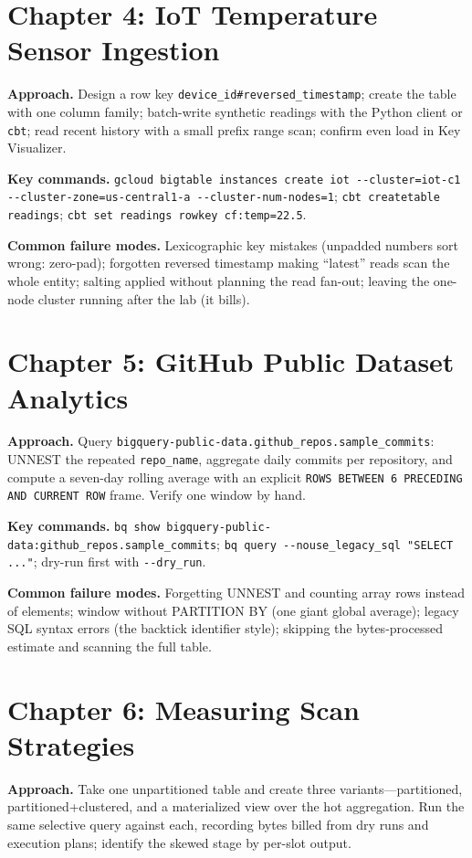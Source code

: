 \section{Chapter 4: IoT Temperature Sensor Ingestion}
\textbf{Approach.} Design a row key \texttt{device\_id\#reversed\_timestamp}; create the table
with one column family; batch-write synthetic readings with the Python client or \texttt{cbt};
read recent history with a small prefix range scan; confirm even load in Key Visualizer.

\textbf{Key commands.} \texttt{gcloud bigtable instances create iot -{}-cluster=iot-c1
-{}-cluster-zone=us-central1-a -{}-cluster-num-nodes=1}; \texttt{cbt createtable readings};
\texttt{cbt set readings rowkey cf:temp=22.5}.

\textbf{Common failure modes.} Lexicographic key mistakes (unpadded numbers sort wrong: zero-pad);
forgotten reversed timestamp making ``latest'' reads scan the whole entity; salting applied without
planning the read fan-out; leaving the one-node cluster running after the lab (it bills).

\section{Chapter 5: GitHub Public Dataset Analytics}
\textbf{Approach.} Query \texttt{bigquery-public-data.github\_repos.sample\_commits}: UNNEST the
repeated \texttt{repo\_name}, aggregate daily commits per repository, and compute a seven-day
rolling average with an explicit \texttt{ROWS BETWEEN 6 PRECEDING AND CURRENT ROW} frame. Verify
one window by hand.

\textbf{Key commands.} \texttt{bq show bigquery-public-data:github\_repos.sample\_commits};
\texttt{bq query -{}-nouse\_legacy\_sql "SELECT ..."}; dry-run first with \texttt{-{}-dry\_run}.

\textbf{Common failure modes.} Forgetting UNNEST and counting array rows instead of elements;
window without PARTITION BY (one giant global average); legacy SQL syntax errors (the backtick
identifier style); skipping the bytes-processed estimate and scanning the full table.

\section{Chapter 6: Measuring Scan Strategies}
\textbf{Approach.} Take one unpartitioned table and create three variants---partitioned,
partitioned+clustered, and a materialized view over the hot aggregation. Run the same selective
query against each, recording bytes billed from dry runs and execution plans; identify the skewed
stage by per-slot output.

